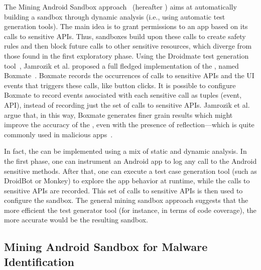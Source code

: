 The Mining Android Sandbox approach~\cite{DBLP:conf/icse/JamrozikSZ16} (hereafter \mas) aims at automatically
building a sandbox through dynamic analysis (i.e., using automatic test generation tools).
The main idea is to grant permissions to an app based on its calls to sensitive APIs.
Thus, sandboxes build upon these calls to create safety rules and then block future
calls to other sensitive resources, which diverge from those found in the first exploratory
phase. Using the Droidmate test generation tool~\cite{DBLP:conf/icse/JamrozikZ16},
Jamrozik et al. proposed a full fledged
implementation of the \mas, named Boxmate~\cite{DBLP:conf/icse/JamrozikSZ16}. 
Boxmate records the occurrences of calls to sensitive APIs and the UI events that triggers these calls,
like button clicks. It is possible to configure Boxmate to record events associated with each sensitive call as
tuples (event, API), instead of recording just the set of calls to sensitive APIs. Jamrozik et al. argue that, in this way, Boxmate generates finer
grain results which
might improve the accuracy of the \mas, even with the presence of reflection---which is quite commonly used in
malicious apps~\cite{DBLP:conf/issta/0029BOK16}.

In fact, the \mas can be implemented using
a mix of static and dynamic analysis. In the first phase, one
can instrument an Android app to log any call to the Android sensitive methods.
After that, one can execute a test case generation tool (such as DroidBot
or Monkey) to explore the app behavior at runtime,
while the calls to sensitive APIs are recorded.
This set of calls to sensitive APIs is then used
to configure the sandbox. The general mining sandbox approach %
suggests that the more efficient the test generator tool (for instance, in terms of code coverage),
the more accurate would be the resulting sandbox.





\subsection{Mining Android Sandbox for Malware Identification}

